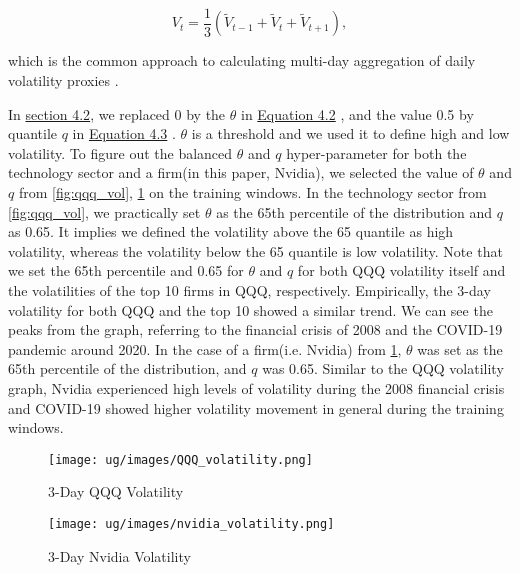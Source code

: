 \documentclass[logo,bsc,singlespacing,parskip]{infthesis}
\begin{document}
\begin{equation} \label{5.4}
V_t = \frac{1}{3} \left( \tilde{V}_{t-1} + \tilde{V}_t + \tilde{V}_{t+1} \right),
\end{equation}

which is the common approach to calculating multi-day aggregation of daily volatility proxies \cite{corsi2009simple}.

In \hyperref[sec:volatility_label]{section 4.2}, we replaced 0 by the $\theta$ in \hyperref[4.2]{Equation 4.2} , and the value 0.5 by quantile $q$ in \hyperref[4.3]{Equation 4.3} . $\theta$ is a threshold and we used it to define high and low volatility. To figure out the balanced $\theta $ and $q$ hyper-parameter for both the technology sector and a firm(in this paper, Nvidia), we selected the value of $\theta$ and $q$ from \ref{fig:qqq_vol}, \ref{fig:nvidia_vol} on the training windows. In the technology sector from \ref{fig:qqq_vol}, we practically set $\theta$ as the 65th percentile of the distribution and $q$ as 0.65. It implies we defined the volatility above the 65 quantile as high volatility, whereas the volatility below the 65 quantile is low volatility. Note that we set the 65th percentile and 0.65 for $\theta$ and $q$ for both QQQ volatility itself and the volatilities of the top 10 firms in QQQ, respectively. Empirically, the 3-day volatility for both QQQ and the top 10 showed a similar trend. We can see the peaks from the graph, referring to the financial crisis of 2008 and the COVID-19 pandemic around 2020. In the case of a firm(i.e. Nvidia) from \ref{fig:nvidia_vol}, $\theta $ was set as the 65th percentile of the distribution, and $q$ was 0.65. Similar to the QQQ volatility graph, Nvidia experienced high levels of volatility during the 2008 financial crisis and COVID-19 showed higher volatility movement in general during the training windows.

\begin{figure}[ht]
  \centering
  \begin{minipage}{0.5\textwidth}
    \centering
    \texttt{[image: ug/images/QQQ\_volatility.png]} %
    \caption{3-Day QQQ Volatility}
    \label{fig:qqq_vol}
  \end{minipage}%
  \begin{minipage}{0.5\textwidth}
    \centering
    \texttt{[image: ug/images/nvidia\_volatility.png]} %
    \caption{3-Day Nvidia Volatility}
    \label{fig:nvidia_vol}
  \end{minipage}
\end{figure}
\end{document}

